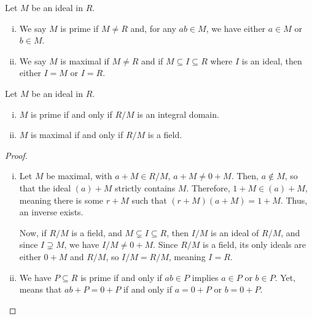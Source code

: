 \documentclass[10pt]{mypackage}
\begin{document}
\begin{definition}
  Let $M$ be an ideal in $R$.
  \begin{enumerate}[(i)]
    \item We say $M$ is prime if $M\neq R$ and, for any $ab\in M$, we have either $a\in M$ or $b\in M$.
    \item We say $M$ is maximal if $M\neq R$ and if $M\subseteq I\subseteq R$ where $I$ is an ideal, then either $I = M$ or $I = R$.
  \end{enumerate}
\end{definition}
\begin{theorem}
  Let $M$ be an ideal in $R$.
  \begin{enumerate}[(i)]
    \item $M$ is prime if and only if $R/M$ is an integral domain.
    \item $M$ is maximal if and only if $R/M$ is a field.
  \end{enumerate}
\end{theorem}
\begin{proof}\hfill
  \begin{enumerate}[(i)]
    \item Let $M$ be maximal, with $a + M \in R/M$, $a + M \neq 0 + M$. Then, $a\notin M$, so that the ideal $\left( a \right) + M$ strictly contains $M$. Therefore, $1 + M\in \left( a \right) + M$, meaning there is some $r + M$ such that $ \left( r + M \right)\left( a + M \right) = 1 + M $. Thus, an inverse exists.%

      Now, if $R/M$ is a field, and $M \subsetneq I \subseteq R$, then $I/M$ is an ideal of $R/M$, and since $I\supsetneq M$, we have $I/M\neq 0 + M$. Since $R/M$ is a field, its only ideals are either $ 0 + M $ and $R/M$, so $I/M = R/M$, meaning $I = R$.
    \item We have $P\subseteq R$ is prime if and only if $ab\in P$ implies $a\in P$ or $b\in P$. Yet, means that $ab + P = 0 + P$ if and only if $ a = 0 + P $ or $b = 0 + P$.
  \end{enumerate}
\end{proof}
\end{document}
